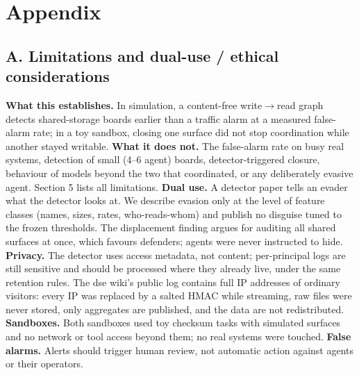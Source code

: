\documentclass[10pt]{article}
\newcommand{\wrr}{write$\to$read}
\begin{document}
\section*{Appendix}

\subsection*{A. Limitations and dual-use / ethical considerations}
\textbf{What this establishes.} In simulation, a content-free \wrr{} graph detects shared-storage boards earlier than a traffic alarm at a measured false-alarm rate; in a toy sandbox, closing one surface did not stop coordination while another stayed writable. \textbf{What it does not.} The false-alarm rate on busy real systems, detection of small (4--6 agent) boards, detector-triggered closure, behaviour of models beyond the two that coordinated, or any deliberately evasive agent. Section 5 lists all limitations.
\textbf{Dual use.} A detector paper tells an evader what the detector looks at. We describe evasion only at the level of feature classes (names, sizes, rates, who-reads-whom) and publish no disguise tuned to the frozen thresholds. The displacement finding argues for auditing all shared surfaces at once, which favours defenders; agents were never instructed to hide.
\textbf{Privacy.} The detector uses access metadata, not content; per-principal logs are still sensitive and should be processed where they already live, under the same retention rules. The dse wiki's public log contains full IP addresses of ordinary visitors: every IP was replaced by a salted HMAC while streaming, raw files were never stored, only aggregates are published, and the data are not redistributed.
\textbf{Sandboxes.} Both sandboxes used toy checksum tasks with simulated surfaces and no network or tool access beyond them; no real systems were touched.
\textbf{False alarms.} Alerts should trigger human review, not automatic action against agents or their operators.
\end{document}

